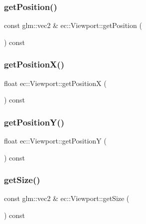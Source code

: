 \subsubsection{\texorpdfstring{get\+Position()}{getPosition()}}
{\footnotesize\ttfamily const glm\+::vec2 \& ec\+::\+Viewport\+::get\+Position (\begin{DoxyParamCaption}{ }\end{DoxyParamCaption}) const}

\mbox{\label{classec_1_1_viewport_a304136185660866e1df70b4f2d74f5c6}} 
\subsubsection{\texorpdfstring{get\+Position\+X()}{getPositionX()}}
{\footnotesize\ttfamily float ec\+::\+Viewport\+::get\+PositionX (\begin{DoxyParamCaption}{ }\end{DoxyParamCaption}) const}

\mbox{\label{classec_1_1_viewport_a6c8e4dc096406135b485347a8e458ddc}} 
\subsubsection{\texorpdfstring{get\+Position\+Y()}{getPositionY()}}
{\footnotesize\ttfamily float ec\+::\+Viewport\+::get\+PositionY (\begin{DoxyParamCaption}{ }\end{DoxyParamCaption}) const}

\mbox{\label{classec_1_1_viewport_a8f56fdabf8e67580a96e9dee4e9e359f}} 
\subsubsection{\texorpdfstring{get\+Size()}{getSize()}}
{\footnotesize\ttfamily const glm\+::vec2 \& ec\+::\+Viewport\+::get\+Size (\begin{DoxyParamCaption}{ }\end{DoxyParamCaption}) const}

